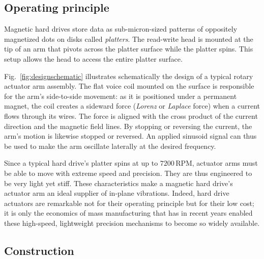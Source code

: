 \documentclass[11.5pt,oneside]{book}
\newcommand*{\figref}[1]{Fig.~\ref{#1}}
\begin{document}
\subsection{Operating principle}
Magnetic hard drives store data as sub-micron-sized patterns of 
oppositely magnetized dots on disks called \emph{platters}. The read-write head
is mounted at the tip of an arm that pivots across the platter surface while the
platter spins. This setup allows the head to access the entire platter surface.

\figref{fig:designschematic} illustrates schematically the design of a typical
rotary actuator arm assembly. The flat voice coil mounted on the surface is responsible
for the arm's side-to-side movement: as it is positioned under a permanent
magnet, the coil creates a sideward force (\emph{Lorenz} or \emph{Laplace}
force) when a current flows through its wires. The force is aligned with the
cross product of the current direction and the magnetic field lines. By stopping
or reversing the current, the arm's motion is likewise stopped or reversed. An
applied sinusoid signal can thus be used to make the arm oscillate laterally at
the desired frequency.

Since a typical hard drive's platter spins at up to $7200\,$RPM,
actuator arms must be able to move with extreme speed and precision. They are
thus engineered to be very light yet stiff. These characteristics make a
magnetic hard drive's actuator arm an ideal supplier of in-plane vibrations.
Indeed, hard drive actuators are remarkable not for their operating principle
but for their low cost; it is only the economics of mass manufacturing that has
in recent years enabled these high-speed, lightweight precision mechanisms to
become so widely available.

\subsection{Construction}
\end{document}
